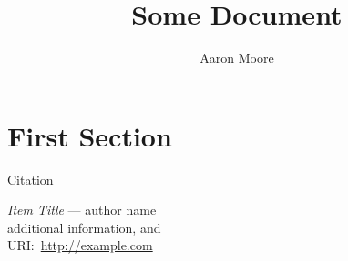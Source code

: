 \documentclass{article}
\title{Some Document}
\author{Aaron Moore}
\date{}
\begin{document}
\maketitle \thispagestyle{fancy}
\section{First Section}
Citation\cite{itemid}\par
\lipsum[1-10]

\pagebreak{}
\begin{thebibliography}{9}
	\emph{Item Title} --- author name\\
		additional information, and\\
		URI:~\url{http://example.com}
\end{thebibliography}
\end{document}
